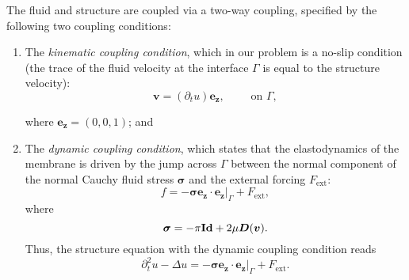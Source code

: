 \documentclass[letterpaper, 11pt,  reqno]{amsart}
\newcommand{\1}{\hspace{0.5mm}\text{I}\hspace{0.2mm}}
\newcommand{\noi}{\noindent}
\newcommand{\Id}{\textup{\bf Id}}
\numberwithin{equation}{section}
\numberwithin{theorem}{section}
\begin{document}
The fluid and structure are coupled via a two-way coupling, specified by the following two coupling conditions:\begin{enumerate}
\item The \textit{kinematic coupling condition}, which in our problem is a no-slip condition (the trace of the fluid velocity at the interface $\Gamma$ is equal to the 
structure velocity):
\begin{equation}
\boldsymbol{v} = (\partial_{t}u) \boldsymbol{e_{z}}, \qquad \text{ on } \Gamma,
\label{kin1}
\end{equation}

\noi
where $ \boldsymbol{e_{z}} = (0, 0, 1)$; and

\item The \textit{dynamic coupling condition}, which states that the elastodynamics of the membrane is driven by the jump across $\Gamma$ between the normal component 
of the normal Cauchy fluid stress $\boldsymbol{\sigma}$ and the external forcing $F_{\text{ext}}$:
\begin{equation*}
f = -\boldsymbol{\sigma} \boldsymbol{e_{z}} \cdot \boldsymbol{e_{z}}|_{\Gamma} + F_{\text{ext}},
\end{equation*}
where
\begin{equation}\label{kinematic}
\boldsymbol{\sigma} = -\pi \Id  + 2\mu \boldsymbol{D}(\boldsymbol{v}).
\end{equation}
Thus, the structure equation with the dynamic coupling condition reads
\begin{equation}\label{dynamic}
\partial_{t}^{2} u - \Delta u = -\boldsymbol{\sigma} \boldsymbol{e_{z}} \cdot \boldsymbol{e_{z}}|_{\Gamma} + F_{\text{ext}}.
\end{equation}
\end{enumerate}
\end{document}
